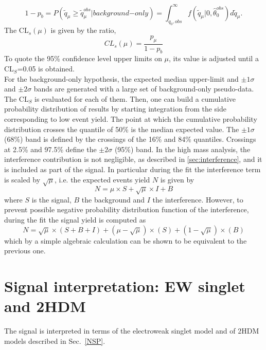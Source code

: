 \begin{equation}
 1- p_{b}= P( \tilde{q}_{\mu} \geq \tilde{q}_{\mu}^{obs} | background\mathrm{-}only)=  \int_{ q_{0},obs }^{\infty } f(\tilde{q}_{\mu}| 0, \hat{\theta}_{0}^{obs}   ) d \tilde{q}_{\mu}.   \end{equation}
The CL$_{s}(\mu)$ is given by the ratio,
\begin{equation}
  CL_s(\mu)=\frac{p_{\mu}}{1-p_b}   \end{equation}
To quote the 95\% confidence level upper limits on $\mu$, its value is adjusted until a CL$_S$=0.05 is obtained.\\
\newline
For the background-only hypothesis, the expected median upper-limit and $\pm 1 \sigma$ and $\pm 2 \sigma$ bands are generated with a large set of background-only pseudo-data. The CL$_S$ is evaluated for each of them.
Then,  one can build a cumulative probability distribution of results by starting integration from the side corresponding to low event yield.
The point at which the cumulative probability distribution crosses the quantile of 50\% is the median expected value. 
The  $\pm 1 \sigma$ (68\%) band is defined by the crossings of the 16\% and 84\% quantiles.  Crossings at 2.5\% and 97.5\% define the  $\pm 2 \sigma$ (95\%) band.
\newline
In the high mass analysis,  the interference contribution is not negligible, as described in \ref{sec:interference}, and it is included as part of the signal. 
In particular during the fit the interference term is scaled by $\sqrt{\mu}$, i.e. the expected events yield $N$ is given by 
\begin{equation}
N =\mu\times S + \sqrt{\mu} \times I + B 
 \end{equation}
where  $S$ is the signal, $B$ the background and $I$ the interference.
However, to prevent possible negative probability distribution function of the interference,  during the fit the signal yield is computed as
\begin{equation}
N =\sqrt{\mu} \times (S+B+I)+ (\mu -\sqrt{\mu}) \times (S) + (1-\sqrt{\mu}) \times (B)
\end{equation}
which by a simple algebraic calculation can be shown to be equivalent to the previous one.

\section{Signal interpretation: EW singlet and  2HDM}
\label{sec:signalModel}
The signal is interpreted in terms of the electroweak singlet model and of 2HDM models described in Sec.~\ref{NSP}. 

